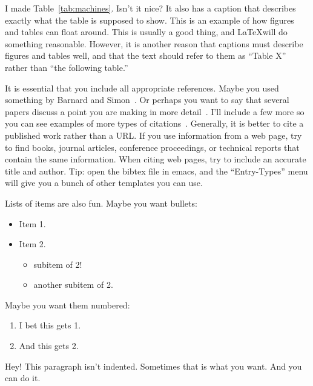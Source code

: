 \documentclass[12pt]{article}
\begin{document}
I made Table~\ref{tab:machines}.  Isn't it nice?  It also has a
caption that describes exactly what the table is supposed to show.
This is an example of how figures and tables can float around.  This
is usually a good thing, and \LaTeX will do something reasonable.
However, it is another reason that captions must describe figures and
tables well, and that the text should refer to them as ``Table X''
rather than ``the following table.''

It is essential that you include all appropriate references.  Maybe
you used something by Barnard and Simon~\cite{barnard94a}.  Or perhaps
you want to say that several papers discuss a point you are making in
more detail~\cite{beall98a,einstein}.  I'll include a few more so you
can see examples of more types of
citations~\cite{gzip,binks99,sagan94a}.  Generally, it is better to
cite a published work rather than a URL.  If you use information from
a web page, try to find books, journal articles, conference
proceedings, or technical reports that contain the same information.
When citing web pages, try to include an accurate title and author.
Tip: open the bibtex file in emacs, and the ``Entry-Types'' menu will
give you a bunch of other templates you can use.

Lists of items are also fun.  Maybe you want bullets:

\begin{itemize}

\item Item 1.

\item Item 2.

  \begin{itemize}
   \item subitem of 2!
   \item another subitem of 2.
  \end{itemize}

\end{itemize}

Maybe you want them numbered:

\begin{enumerate}

\item I bet this gets 1.

\item And this gets 2.

\end{enumerate}

\noindent
Hey!  This paragraph isn't indented.  Sometimes that is what you
want.  And you can do it.
\end{document}
